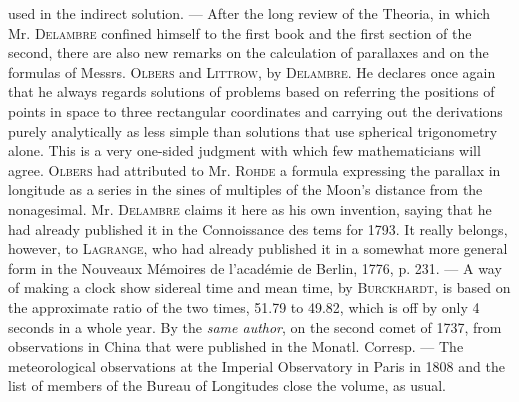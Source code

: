 used in the indirect solution. --- After the long review of the Theoria, in which Mr. \textsc{Delambre} confined himself to the first book and the first section of the second, there are also new remarks on the calculation of parallaxes and on the formulas of Messrs. \textsc{Olbers} and \textsc{Littrow}, by \textsc{Delambre}. He declares once again that he always regards solutions of problems based on referring the positions of points in space to three rectangular coordinates and carrying out the derivations purely analytically as less simple than solutions that use spherical trigonometry alone. This is a very one-sided judgment with which few mathematicians will agree. \textsc{Olbers} had attributed to Mr. \textsc{Rohde} a formula expressing the parallax in longitude as a series in the sines of multiples of the Moon's distance from the nonagesimal. Mr. \textsc{Delambre} claims it here as his own invention, saying that he had already published it in the Connoissance des tems for 1793. It really belongs, however, to \textsc{Lagrange}, who had already published it in a somewhat more general form in the Nouveaux Mémoires de l'académie de Berlin, 1776, p. 231. --- A way of making a clock show sidereal time and mean time, by \textsc{Burckhardt}, is based on the approximate ratio of the two times, 51.79 to 49.82, which is off by only 4 seconds in a whole year. By the \emph{same author}, on the second comet of 1737, from observations in China that were published in the Monatl. Corresp. --- The meteorological observations at the Imperial Observatory in Paris in 1808 and the list of members of the Bureau of Longitudes close the volume, as usual.
